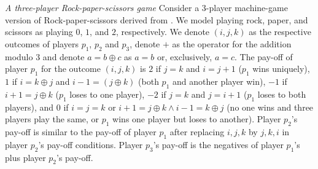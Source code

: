 \begin{example}\textit{A three-player Rock-paper-scissors game}\label{ex:rps}
Consider a $3$-player machine-game version of Rock-paper-scissors derived from \cite{PH10}. We model playing rock, paper, and scissors as playing $0$, $1$, and $2$, respectively. We denote $(i,j,k)$ as the respective outcomes of players $p_1$, $p_2$ and $p_3$, denote $+$ as the operator for the addition modulo $3$ and denote $a = b \oplus c$ as $a = b$ or, exclusively, $a = c$. The pay-off of player $p_1$ for the outcome $(i, j, k)$ is $2$ if $j=k$ and $i = j + 1$ ($p_1$ wins uniquely), $1$ if $i=k\oplus j$ and $i-1 = (j\oplus k)$ (both $p_1$ and another player win), $-1$ if $i + 1=j\oplus k$ ($p_1$ loses to one player), $-2$ if $j=k$ and $j = i + 1$ ($p_1$ loses to both players), and $0$ if $i = j = k$ or $i+1=j\oplus k \land i-1=k\oplus j $ (no one wins and three players play the same, or $p_1$ wins one player but loses to another). Player $p_2$'s pay-off is similar to the pay-off of player $p_1$ after replacing $i,j,k$ by $j,k,i$ in player $p_2$'s pay-off conditions. Player $p_3$'s pay-off is the negatives of player $p_1$'s plus player $p_2$'s pay-off. %
\end{example}


